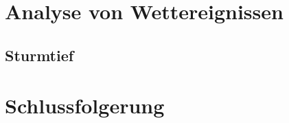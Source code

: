 \begin{refsection}
\section{Analyse von Wettereignissen}

\subsection{Sturmtief}


\section{Schlussfolgerung}

\printbibliography[heading=subbibliography]
\end{refsection}
